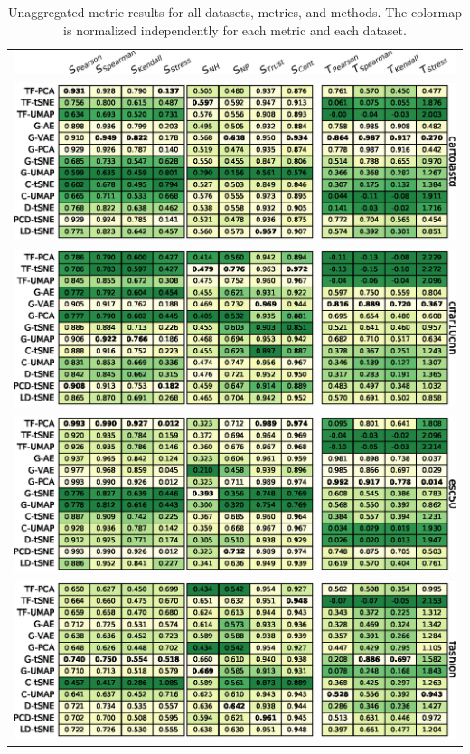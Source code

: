 \begin{table}[h]
\begin{tabular}{c}
  \vspace{-.1cm}
  \includegraphics[width=\linewidth]{figures/projection-algorithm/table_header.png} \\
  \includegraphics[width=\linewidth]{figures/projection-algorithm/table_cartolastd.eps} \\
  \includegraphics[width=\linewidth]{figures/projection-algorithm/table_cifar10cnn.eps} \\ 
  \includegraphics[width=\linewidth]{figures/projection-algorithm/table_esc50.eps} \\
  \includegraphics[width=\linewidth]{figures/projection-algorithm/table_fashion.eps} \\
\end{tabular}
\caption{Unaggregated metric results for all datasets, metrics, and methods. The colormap is normalized independently for each metric and each dataset.}
\label{tab:unaggregated}
\end{table}


